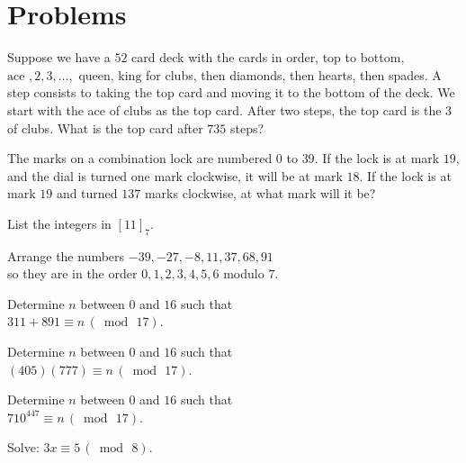 \section{Problems}

\begin{prob}
 Suppose we have a $52$ card deck with the cards in order, top to bottom, $\text{ace }, 2, 3, \ldots,\text{ queen, king}$ for clubs, then diamonds, then hearts, then spades. A step consists to taking the top card and moving it to the bottom of the deck. We start with the ace of clubs as the top card. After two steps, the top card is the $3$ of clubs. What is the top card after $735$ steps?
\end{prob}

\begin{prob}
The marks on a combination lock are numbered $0$ to $39$. If the lock is at  mark $19$, and the dial is turned one mark clockwise, it will be
at mark $18$. If the lock is at mark $19$ and turned $137$ marks clockwise, at what mark will it be?
\end{prob}

\begin{prob}
List the integers in $[11]_{7}$.
\end{prob}

\begin{prob}
Arrange the numbers $-39, -27, -8, 11, 37, 68, 91$ \\
so they are in the order $0,1,2,3,4,5,6$ modulo $7$.
\end{prob}

\begin{prob}
Determine $n$ between $0$ and $16$ such that\\
 $311+891 \equiv n \,(\bmod\,17)$.
\end{prob}

\begin{prob}
Determine $n$ between $0$ and $16$ such that \\
$(405)(777) \equiv n \,(\bmod\,17)$.
\end{prob}

\begin{prob}
Determine $n$ between $0$ and $16$ such that\\
 $710^{447} \equiv n \,(\bmod\,17)$.
\end{prob}

\begin{prob}
Solve: $3x\equiv 5\,(\bmod\, 8)$.
\end{prob}

